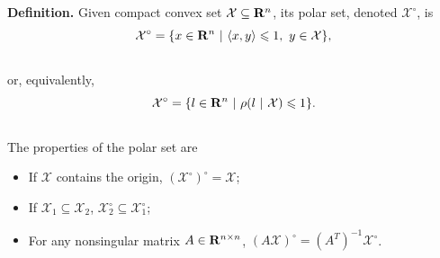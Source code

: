 \documentclass[letterpaper,10pt,english]{sphinxmanual}
\begin{document}
\textbf{Definition.} Given compact convex set ${\mathcal X}\subseteq{\bf R}^n$, its polar
set, denoted ${\mathcal X}^\circ$, is
\begin{gather}
\begin{split}{\mathcal X}^\circ = \{x\in{\bf R}^n ~|~ \langle x,y\rangle\leqslant1, ~ y\in{\mathcal X}\},\end{split}\notag\\\begin{split}\end{split}\notag
\end{gather}
or, equivalently,
\begin{gather}
\begin{split}{\mathcal X}^\circ = \{l\in{\bf R}^n ~|~ \rho(l ~|~ {\mathcal X})\leqslant1\}.\end{split}\notag\\\begin{split}\end{split}\notag
\end{gather}
The properties of the polar set are
\begin{itemize}
\item {} 
If ${\mathcal X}$ contains the origin,
$({\mathcal X}^\circ)^\circ = {\mathcal X}$;

\item {} 
If ${\mathcal X}_1\subseteq{\mathcal X}_2$,
${\mathcal X}_2^\circ\subseteq{\mathcal X}_1^\circ$;

\item {} 
For any nonsingular matrix $A\in{\bf R}^{n\times n}$,
$(A{\mathcal X})^\circ = (A^T)^{-1}{\mathcal X}^\circ$.

\end{itemize}
\end{document}

